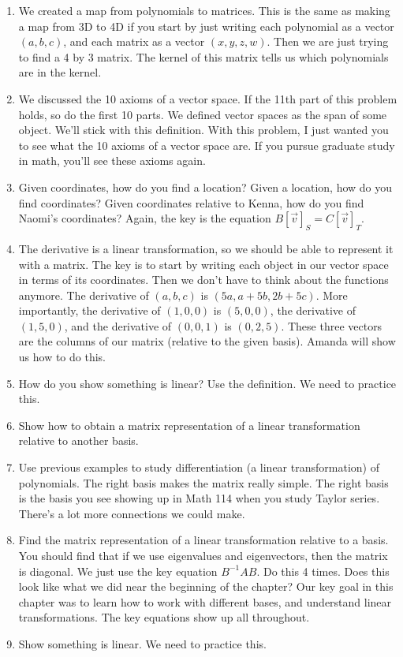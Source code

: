 \documentclass[letterpaper,oneside]{book}%
\theoremstyle{plain}
\theoremstyle{box}
\theoremstyle{problem}
\begin{document}
\begin{enumerate}
 \item We created a map from polynomials to matrices. This is the same as making a map from 3D to 4D if you start by just writing each polynomial as a vector $(a,b,c)$, and each matrix as a vector $(x,y,z,w)$.  Then we are just trying to find a 4 by 3 matrix.  The kernel of this matrix tells us which polynomials are in the kernel.
 \item We discussed the 10 axioms of a vector space.  If the 11th part of this problem holds, so do the first 10 parts.  We defined vector spaces as the span of some object. We'll stick with this definition.  With this problem, I just wanted you to see what the 10 axioms of a vector space are.  If you pursue graduate study in math, you'll see these axioms again.
 \item Given coordinates, how do you find a location?  Given a location, how do you find coordinates? Given coordinates relative to Kenna, how do you find Naomi's coordinates?  Again, the key is the equation $B[\vec v]_S = C[\vec v]_T$. 
 \item The derivative is a linear transformation, so we should be able to represent it with a matrix. The key is to start by writing each object in our vector space in terms of its coordinates.  Then we don't have to think about the functions anymore. The derivative of $(a,b,c)$ is $(5a,a+5b,2b+5c)$.  More importantly, the derivative of $(1,0,0)$ is $(5,0,0)$, the derivative of $(1,5,0)$, and the derivative of $(0,0,1)$ is $(0,2,5)$.  These three vectors are the columns of our matrix (relative to the given basis). Amanda will show us how to do this.
 \item How do you show something is linear?  Use the definition. We need to practice this.
 \item Show how to obtain a matrix representation of a linear transformation relative to another basis. 
 \item Use previous examples to study differentiation (a linear transformation) of polynomials. The right basis makes the matrix really simple. The right basis is the basis you see showing up in Math 114 when you study Taylor series. There's a lot more connections we could make.
 \item Find the matrix representation of a linear transformation relative to a basis.  You should find that if we use eigenvalues and eigenvectors, then the matrix is diagonal.  We just use the key equation $B^{-1}AB$. Do this 4 times.  Does this look like what we did near the beginning of the chapter?  Our key goal in this chapter was to learn how to work with different bases, and understand linear transformations.  The key equations show up all throughout.  
 \item Show something is linear.  We need to practice this. 
\end{enumerate}
\end{document}
